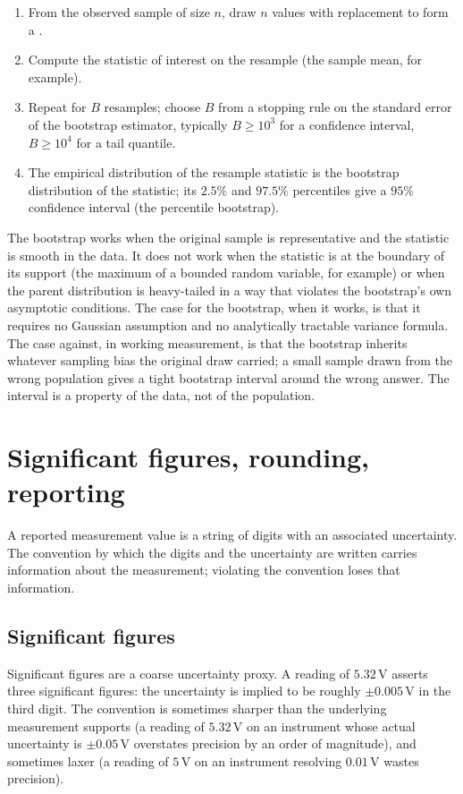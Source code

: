 \begin{enumerate}[leftmargin=*]
  \item From the observed sample of size $n$, draw $n$ values with
    replacement to form a .
  \item Compute the statistic of interest on the resample (the
    sample mean, for example).
  \item Repeat for $B$ resamples; choose $B$ from a stopping rule
    on the standard error of the bootstrap estimator, typically
    $B \geq 10^{3}$ for a confidence interval, $B \geq 10^{4}$ for
    a tail quantile.
  \item The empirical distribution of the resample statistic is
    the bootstrap distribution of the statistic; its $2.5\%$ and
    $97.5\%$ percentiles give a $95\%$ confidence interval (the
    percentile bootstrap).
\end{enumerate}

The bootstrap works when the original sample is representative and
the statistic is smooth in the data. It does not work when the
statistic is at the boundary of its support (the maximum of a
bounded random variable, for example) or when the parent
distribution is heavy-tailed in a way that violates the bootstrap's
own asymptotic conditions. The case for the bootstrap, when it
works, is that it requires no Gaussian assumption and no
analytically tractable variance formula. The case against, in
working measurement, is that the bootstrap inherits whatever
sampling bias the original draw carried; a small sample drawn from
the wrong population gives a tight bootstrap interval around the
wrong answer. The interval is a property of the data, not of the
population.

\section{Significant figures, rounding, reporting}

A reported measurement value is a string of digits with an
associated uncertainty. The convention by which the digits and the
uncertainty are written carries information about the measurement;
violating the convention loses that information.

\subsection{Significant figures}

Significant figures are a coarse uncertainty proxy. A reading of
$5.32 \,\si{\volt}$ asserts three significant figures: the
uncertainty is implied to be roughly $\pm 0.005 \,\si{\volt}$ in
the third digit. The convention is sometimes sharper than the
underlying measurement supports (a reading of $5.32 \,\si{\volt}$
on an instrument whose actual uncertainty is $\pm 0.05 \,\si{\volt}$
overstates precision by an order of magnitude), and sometimes
laxer (a reading of $5 \,\si{\volt}$ on an instrument resolving
$0.01 \,\si{\volt}$ wastes precision).


